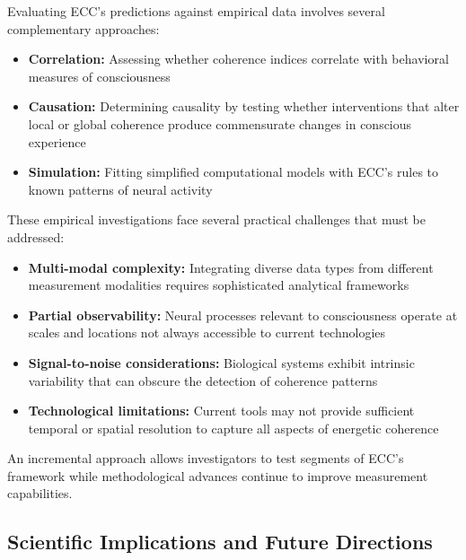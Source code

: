 Evaluating ECC's predictions against empirical data involves several complementary approaches:

\begin{itemize}
    \item \textbf{Correlation:} Assessing whether coherence indices correlate with behavioral measures of consciousness~\cite{Owen2013, Giacino2014}
    
    \item \textbf{Causation:} Determining causality by testing whether interventions that alter local or global coherence produce commensurate changes in conscious experience~\cite{Koch2016}
    
    \item \textbf{Simulation:} Fitting simplified computational models with ECC's rules to known patterns of neural activity~\cite{Dehaene2014, Tononi2016}
\end{itemize}

These empirical investigations face several practical challenges that must be addressed:

\begin{itemize}
    \item \textbf{Multi-modal complexity:} Integrating diverse data types from different measurement modalities requires sophisticated analytical frameworks
    
    \item \textbf{Partial observability:} Neural processes relevant to consciousness operate at scales and locations not always accessible to current technologies
    
    \item \textbf{Signal-to-noise considerations:} Biological systems exhibit intrinsic variability that can obscure the detection of coherence patterns
    
    \item \textbf{Technological limitations:} Current tools may not provide sufficient temporal or spatial resolution to capture all aspects of energetic coherence
\end{itemize}

An incremental approach allows investigators to test segments of ECC's framework while methodological advances continue to improve measurement capabilities.

\subsection*{Scientific Implications and Future Directions}

